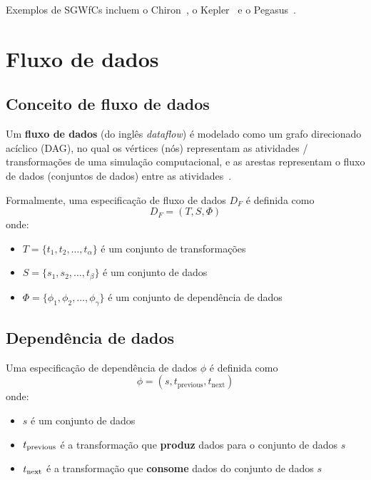 Exemplos de SGWfCs incluem o Chiron~\cite{ogasawara2013chiron}, o Kepler~\cite{ludascher2006scientific} e o Pegasus~\cite{deelman2005pegasus}.

\section{Fluxo de dados}%
\label{sec:dataflow}

\subsection{Conceito de fluxo de dados} %

Um \textbf{fluxo de dados} (do inglês \textit{dataflow}) é modelado como um grafo direcionado acíclico (DAG), no qual os vértices (nós) representam as atividades / transformações de uma simulação computacional, e as arestas representam o fluxo de dados (conjuntos de dados) entre as atividades~\cite{ogasawara2011algebraic}.

Formalmente, uma especificação de fluxo de dados \( D_F \) é definida como \[ D_F = (T, S, \Phi) \] onde:
\begin{itemize}
    \item \( T = \{t_1, t_2, \ldots, t_{\alpha}\} \) é um conjunto de transformações
    \item \( S = \{s_1, s_2, \ldots, t_{\beta}\} \) é um conjunto de dados
    \item \( \Phi = \{\phi_1, \phi_2, \ldots, \phi_{\gamma}\} \) é um conjunto de dependência de dados
\end{itemize}



\subsection{Dependência de dados}

Uma especificação de dependência de dados \( \phi \) é definida como \[ \phi = (s, t_{\textrm{previous}}, t_{\textrm{next}}) \] onde:
\begin{itemize}
    \item \( s \) é um conjunto de dados
    \item \( t_{\textup{previous}} \) é a transformação que {\bf produz} dados para o conjunto de dados \( s \)
    \item \( t_{\textup{next}} \) é a transformação que {\bf consome} dados do conjunto de dados \( s \)
\end{itemize}

